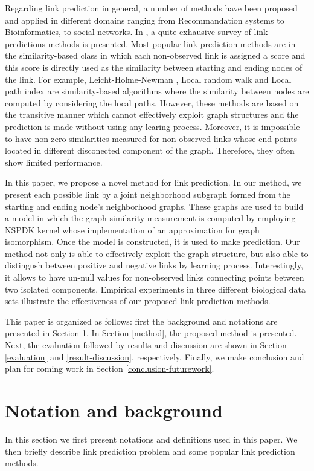 \documentclass{article}
\begin{document}
Regarding link prediction in general, a number of methods have been proposed and applied in different domains ranging from Recommandation systems to Bioinformatics, to social networks. In \cite{link-prediction}, a quite exhausive survey of link predictions methods is presented. Most popular link prediction methods are in the similarity-based class in which each non-observed link is assigned a score and this score is directly used as the similarity between starting and ending nodes of the link. For example, Leicht-Holme-Newman \cite{lhn}, Local random walk \cite{lrw} and Local path index \cite{lpi1} are similarity-based algorithms where the similarity between nodes are computed by considering the local paths. However, these methods are based on the transitive manner which cannot effectively exploit graph structures and the prediction is made without using any learing process. Moreover, it is impossible to have non-zero similarities measured for non-observed links whose end points located in different disconected component of the graph. Therefore, they often show limited performance.

In this paper, we propose a novel method for link prediction. In our method, we present each possible link by a joint neighborhood subgraph formed from the starting and ending node's neighborhood graphs. These graphs are used to build a model in which the graph similarity measurement is computed by employing NSPDK kernel \cite{nspdk} whose implementation of an approximation for graph isomorphism. Once the model is constructed, it is used to make prediction. Our method not only is able to effectively exploit the graph structure, but also able to distingush between positive and negative links by learning process. Interestingly, it allows to have un-null values for non-observed links connecting points between two isolated components. Empirical experiments in three different biological data sets illustrate the effectiveness of our proposed link prediction methods.

This paper is organized as follows: first the background and notations are presented in Section \ref{notation-background}. In Section \ref{method}, the proposed method is presented. Next, the evaluation followed by results and discussion are shown in Section \ref{evaluation} and \ref{result-discussion}, respectively. Finally, we make conclusion and plan for coming work in Section \ref{conclusion-futurework}.

\section{Notation and background}
\label{notation-background}
In this section we first present notations and definitions used in this paper. We then briefly describe link prediction problem and some popular link prediction methods.
\end{document}
